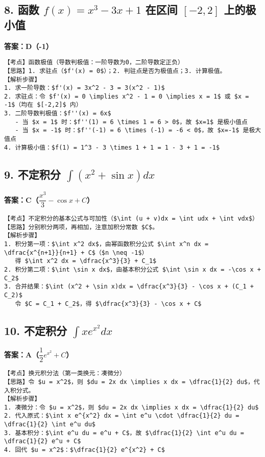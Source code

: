 \documentclass{exam-zh}
\begin{document}
\subsection*{8. 函数 $f(x) = x^3 - 3x + 1$ 在区间 $[-2, 2]$ 上的极小值}
\noindent \textbf{答案：D（-1）}
\begin{verbatim}
【考点】函数极值（导数判极值：一阶导数为0，二阶导数定正负）
【思路】1. 求驻点（$f'(x) = 0$）；2. 判驻点是否为极值点；3. 计算极值。
【解析步骤】
1. 求一阶导数：$f'(x) = 3x^2 - 3 = 3(x^2 - 1)$
2. 求驻点：令 $f'(x) = 0 \implies x^2 - 1 = 0 \implies x = 1$ 或 $x = -1$（均在 $[-2,2]$ 内）
3. 二阶导数判极值：$f''(x) = 6x$
   - 当 $x = 1$ 时：$f''(1) = 6 \times 1 = 6 > 0$，故 $x=1$ 是极小值点
   - 当 $x = -1$ 时：$f''(-1) = 6 \times (-1) = -6 < 0$，故 $x=-1$ 是极大值点
4. 计算极小值：$f(1) = 1^3 - 3 \times 1 + 1 = 1 - 3 + 1 = -1$
\end{verbatim}

\subsection*{9. 不定积分 $\int (x^2 + \sin x) dx$}
\noindent \textbf{答案：C（$\dfrac{x^3}{3} - \cos x + C$）}
\begin{verbatim}
【考点】不定积分的基本公式与可加性（$\int (u + v)dx = \int udx + \int vdx$）
【思路】分别积分两项，再相加，注意加积分常数 $C$。
【解析步骤】
1. 积分第一项：$\int x^2 dx$，由幂函数积分公式 $\int x^n dx = \dfrac{x^{n+1}}{n+1} + C$（$n \neq -1$）
   得 $\int x^2 dx = \dfrac{x^3}{3} + C_1$
2. 积分第二项：$\int \sin x dx$，由基本积分公式 $\int \sin x dx = -\cos x + C_2$
3. 合并结果：$\int (x^2 + \sin x)dx = \dfrac{x^3}{3} - \cos x + (C_1 + C_2)$
   令 $C = C_1 + C_2$，得 $\dfrac{x^3}{3} - \cos x + C$
\end{verbatim}

\subsection*{10. 不定积分 $\int x e^{x^2} dx$}
\noindent \textbf{答案：A（$\dfrac{1}{2} e^{x^2} + C$）}
\begin{verbatim}
【考点】换元积分法（第一类换元：凑微分）
【思路】令 $u = x^2$，则 $du = 2x dx \implies x dx = \dfrac{1}{2} du$，代入积分式。
【解析步骤】
1. 凑微分：令 $u = x^2$，则 $du = 2x dx \implies x dx = \dfrac{1}{2} du$
2. 代入原式：$\int x e^{x^2} dx = \int e^u \cdot \dfrac{1}{2} du = \dfrac{1}{2} \int e^u du$
3. 基本积分：$\int e^u du = e^u + C$，故 $\dfrac{1}{2} \int e^u du = \dfrac{1}{2} e^u + C$
4. 回代 $u = x^2$：$\dfrac{1}{2} e^{x^2} + C$
\end{verbatim}
\end{document}
